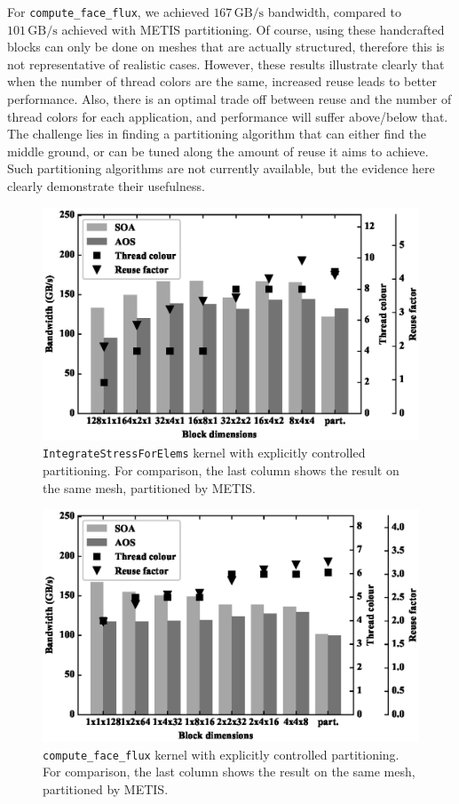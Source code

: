 For \texttt{compute\_face\_flux}, we achieved $167\,\text{GB/s}$ bandwidth,
compared to $101\,\text{GB/s}$ achieved with METIS partitioning. Of course, 
using these handcrafted blocks can only be done on meshes that are actually 
structured, therefore this is not representative of realistic cases. However, 
these results illustrate clearly that when the number of thread colors are the 
same, increased reuse leads to better performance. Also, there is an optimal 
trade off between reuse and the number of thread colors for each application, 
and performance will suffer above/below that. The challenge lies in finding a 
partitioning algorithm that can either find the middle ground, or can be tuned 
along the amount of reuse it aims to achieve. Such partitioning algorithms are 
not currently available, but the evidence here clearly demonstrate their 
usefulness. 


\begin{figure}[Htbp]
  \centering
  \includegraphics[width=12cm]{fig/lulesh_block.eps}
  \caption{\texttt{IntegrateStressForElems} kernel with explicitly controlled
  partitioning. For comparison, the last column shows the result on the same
  mesh, partitioned by METIS.}
  \label{fig:lulesh_block}
\end{figure}

\begin{figure}[Htbp]
  \centering
  \includegraphics[width=12cm]{fig/mini_aero_block.eps}
  \caption{\texttt{compute\_face\_flux} kernel with explicitly controlled
  partitioning. For comparison, the last column shows the result on the same
  mesh, partitioned by METIS.}
  \label{fig:mini_aero_block}
\end{figure}